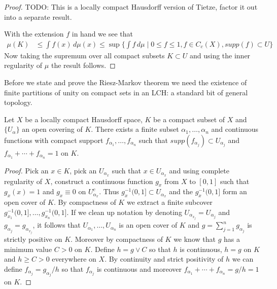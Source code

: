 \begin{proof}
TODO: This is a locally compact Hausdorff version of Tietze, factor it
out into a separate result.

With the extension $f$ in hand we see that 
\begin{align*}
\mu(K) &\leq \int f(x) \, d\mu(x) \leq \sup \lbrace \int f \, d\mu \mid 0 \leq f \leq 1, f \in
C_c(X), supp(f) \subset U \rbrace
\end{align*}
Now taking the supremum over all compact subsets $K \subset U$ and
using the inner regularity of $\mu$ the result follows.
\end{proof}


Before we state and prove the Riesz-Markov theorem we need the
existence of finite partitions of unity on compact sets in an LCH: a standard
bit of general topology.

\begin{lem}\label{PartitionOfUnity}Let $X$ be a locally compact Hausdorff space, $K$ be a
  compact subset of $X$ and $\lbrace U_\alpha \rbrace$ an open
  covering of $K$.  There exists a finite subset $\alpha_1, \dotsc,
  \alpha_n$ and continuous functions with compact support $f_{\alpha_1}, \dotsc,
  f_{\alpha_n}$ such that $supp(f_{\alpha_j}) \subset U_{\alpha_j}$
  and $f_{\alpha_1} + \dotsb + f_{\alpha_n} = 1$ on $K$.
\end{lem}
\begin{proof}
Pick an $x \in K$, pick an $U_{\alpha_x}$ such that $x \in U_{\alpha_x}$ and
using complete regularity of $X$, construct a continuous function
$g_x$ from $X$ to $[0,1]$ such that $g_x(x) = 1$ and
$g_x \equiv 0$ on $U_{\alpha_x}^c$.  Thus $g_x^{-1}(0,1] \subset
U_{\alpha_x}$ and the $g_x^{-1}(0,1]$ form an open cover of $K$.  By
compactness of $K$ we extract a finite subcover $g_{x_1}^{-1}(0,1],
\dotsc, g_{x_n}^{-1}(0,1]$.  If we clean up notation by denoting $U_{\alpha_{x_j}} =
U_{\alpha_j}$ and $g_{\alpha_j} = g_{\alpha_{x_j}}$, it follows that
$U_{\alpha_1}, \dotsc, U_{\alpha_n}$ is an open cover of $K$ and $g =
\sum_{j=1}^n g_{\alpha_j}$ is strictly positive on $K$.  Moreover by
compactness of $K$ we know that $g$ has a minimum value $C > 0$ on
$K$.  Define $h = g \vee C$ so that $h$ is continuous, $h = g$ on $K$ and $h
\geq C > 0$ everywhere on $X$.  By continuity and strict positivity of
$h$ we can define $f_{\alpha_j} = g_{\alpha_j}/h$ so that
$f_{\alpha_j}$ is continuous and moreover $f_{\alpha_1} + \dotsb +
f_{\alpha_n} = g/h = 1$ on $K$.
\end{proof}

